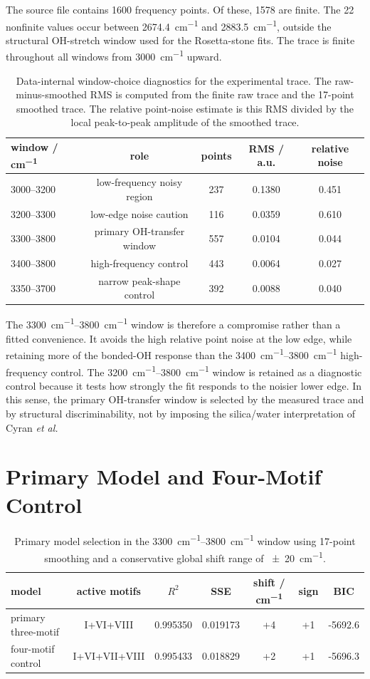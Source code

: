 \documentclass[11pt]{article}
\begin{document}
The source file contains 1600 frequency points. Of these, 1578 are finite. The 22 nonfinite values occur between \SI{2674.4}{cm^{-1}} and \SI{2883.5}{cm^{-1}}, outside the structural OH-stretch window used for the Rosetta-stone fits. The trace is finite throughout all windows from \SI{3000}{cm^{-1}} upward.

\begin{table}[H]
\centering
\caption{Data-internal window-choice diagnostics for the experimental trace. The raw-minus-smoothed RMS is computed from the finite raw trace and the 17-point smoothed trace. The relative point-noise estimate is this RMS divided by the local peak-to-peak amplitude of the smoothed trace.}
\begin{tabular}{lcccc}
\toprule
window / \si{cm^{-1}} & role & points & RMS / a.u. & relative noise \\
\midrule
3000--3200 & low-frequency noisy region & 237 & 0.1380 & 0.451 \\
3200--3300 & low-edge noise caution & 116 & 0.0359 & 0.610 \\
3300--3800 & primary OH-transfer window & 557 & 0.0104 & 0.044 \\
3400--3800 & high-frequency control & 443 & 0.0064 & 0.027 \\
3350--3700 & narrow peak-shape control & 392 & 0.0088 & 0.040 \\
\bottomrule
\end{tabular}
\end{table}

The \SIrange{3300}{3800}{cm^{-1}} window is therefore a compromise rather than a fitted convenience. It avoids the high relative point noise at the low edge, while retaining more of the bonded-OH response than the \SIrange{3400}{3800}{cm^{-1}} high-frequency control. The \SIrange{3200}{3800}{cm^{-1}} window is retained as a diagnostic control because it tests how strongly the fit responds to the noisier lower edge. In this sense, the primary OH-transfer window is selected by the measured trace and by structural discriminability, not by imposing the silica/water interpretation of Cyran \textit{et al.}

\section*{Primary Model and Four-Motif Control}

\begin{table}[H]
\centering
\caption{Primary model selection in the \SIrange{3300}{3800}{cm^{-1}} window using 17-point smoothing and a conservative global shift range of \SI{\pm20}{cm^{-1}}.}
\begin{tabular}{lcccccc}
\toprule
model & active motifs & $R^2$ & SSE & shift / \si{cm^{-1}} & sign & BIC \\
\midrule
primary three-motif & I+VI+VIII & 0.995350 & 0.019173 & +4 & +1 & -5692.6 \\
four-motif control & I+VI+VII+VIII & 0.995433 & 0.018829 & +2 & +1 & -5696.3 \\
\bottomrule
\end{tabular}
\end{table}
\end{document}
